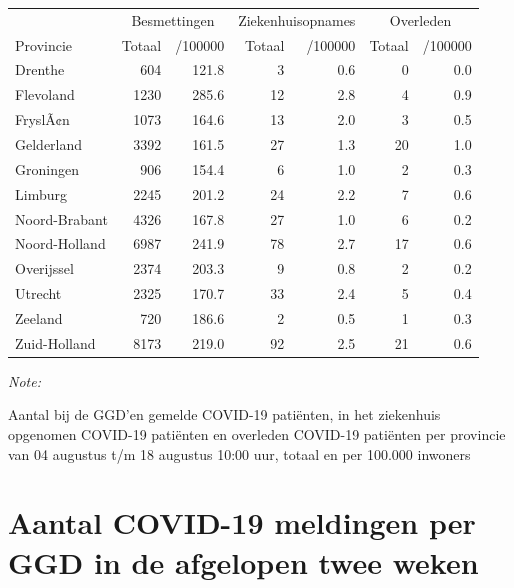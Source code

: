 \documentclass[
  english,
  man,floatsintext]{apa6}
\begin{document}
\begin{table}
\centering
\begin{threeparttable}
\begin{tabular}{lrrrrrr}
\toprule
\multicolumn{1}{c}{ } & \multicolumn{2}{c}{Besmettingen} & \multicolumn{2}{c}{Ziekenhuisopnames} & \multicolumn{2}{c}{Overleden} \\
\cmidrule(l{3pt}r{3pt}){2-3} \cmidrule(l{3pt}r{3pt}){4-5} \cmidrule(l{3pt}r{3pt}){6-7}
Provincie & Totaal & /100000 & Totaal & /100000 & Totaal & /100000\\
\midrule
Drenthe & 604 & 121.8 & 3 & 0.6 & 0 & 0.0\\
Flevoland & 1230 & 285.6 & 12 & 2.8 & 4 & 0.9\\
FryslÃ¢n & 1073 & 164.6 & 13 & 2.0 & 3 & 0.5\\
Gelderland & 3392 & 161.5 & 27 & 1.3 & 20 & 1.0\\
Groningen & 906 & 154.4 & 6 & 1.0 & 2 & 0.3\\
Limburg & 2245 & 201.2 & 24 & 2.2 & 7 & 0.6\\
Noord-Brabant & 4326 & 167.8 & 27 & 1.0 & 6 & 0.2\\
Noord-Holland & 6987 & 241.9 & 78 & 2.7 & 17 & 0.6\\
Overijssel & 2374 & 203.3 & 9 & 0.8 & 2 & 0.2\\
Utrecht & 2325 & 170.7 & 33 & 2.4 & 5 & 0.4\\
Zeeland & 720 & 186.6 & 2 & 0.5 & 1 & 0.3\\
Zuid-Holland & 8173 & 219.0 & 92 & 2.5 & 21 & 0.6\\
\bottomrule
\end{tabular}
\begin{tablenotes}
\item \textit{Note: } 
\item Aantal bij de GGD’en gemelde COVID-19 patiënten, in het ziekenhuis opgenomen COVID-19 patiënten en overleden COVID-19 patiënten per provincie van 04 augustus t/m 18 augustus 10:00 uur, totaal en per 100.000 inwoners
\end{tablenotes}
\end{threeparttable}
\end{table}

\newpage

\hypertarget{aantal-covid-19-meldingen-per-ggd-in-de-afgelopen-twee-weken}{%
\section{Aantal COVID-19 meldingen per GGD in de afgelopen twee weken}\label{aantal-covid-19-meldingen-per-ggd-in-de-afgelopen-twee-weken}}
\end{document}
